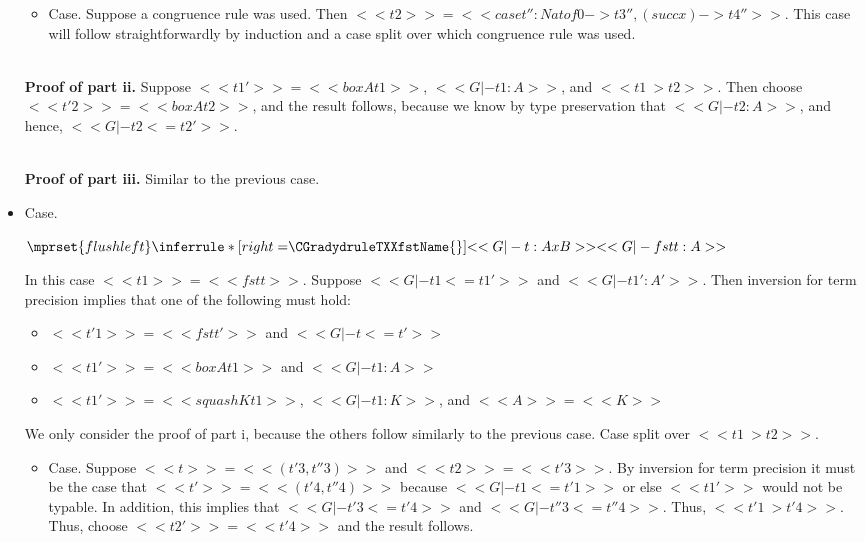 \begin{itemize}
\begin{itemize}
  \item[] Case.  Suppose a congruence rule was used.  Then $<<t2>> = <<case t'' : Nat of 0 -> t3'', (succ x) -> t4''>>$.
    This case will follow straightforwardly by induction and a case split over which congruence rule was used.    
  \end{itemize}

  \ \\
  \noindent
  \textbf{Proof of part ii.}  Suppose $<<t1'>> = <<box A t1>>$, $<<G |- t1 : A>>$, and $<<t1 ~> t2>>$.
  Then choose $<<t'2>> = <<box A t2>>$, and the result follows, because we know by type preservation
  that $<<G |- t2 : A>>$, and hence, $<<G |- t2 <= t2'>>$.

  \ \\
  \noindent
  \textbf{Proof of part iii.}  Similar to the previous case.  

\item[] Case.\ \\ 
  \begin{center}
    \begin{math}
      $$\mprset{flushleft}
      \inferrule* [right=$\CGradydruleTXXfstName{}$] {
        <<G |- t : A x B>>
      }{<<G |- fst t : A>>}
    \end{math}
  \end{center}
  In this case $<<t1>> = <<fst t>>$.  Suppose $<<G |- t1 <= t1'>>$ and $<<G |- t1' : A'>>$.
  Then inversion for term precision implies that one of the following must hold:
  \begin{itemize}
  \item $<<t'1>> = <<fst t'>>$ and $<<G |- t <= t'>>$
  \item $<<t1'>> = <<box A t1>>$ and $<<G |- t1 : A>>$
  \item $<<t1'>> = <<squash K t1>>$, $<<G |- t1 : K>>$, and $<<A>> = <<K>>$
  \end{itemize}

  We only consider the proof of part i, because the others follow similarly to
  the previous case. Case split over $<<t1 ~> t2>>$.
  \begin{itemize}
  \item[] Case. Suppose $<<t>> = <<(t'3,t''3)>>$ and $<<t2>> = <<t'3>>$.  By inversion for term precision it must be the case
    that $<<t'>> = <<(t'4,t''4)>>$ because $<<G |- t1 <= t'1>>$ or else $<<t1'>>$ would not be typable.  In addition,
    this implies that $<<G |- t'3 <= t'4>>$ and $<<G |- t''3 <= t''4>>$.
    Thus, $<<t'1 ~> t'4>>$. Thus, choose $<<t2'>> = <<t'4>>$ and the result follows.


\end{itemize}
\end{itemize}
